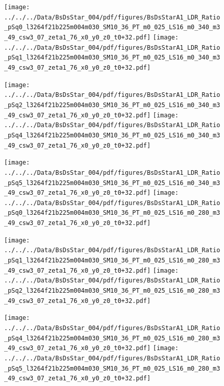 \documentclass[a4paper,10pt]{article}
\begin{document}
\begin{figure}[p]
 \texttt{[image: ../../../Data/BsDsStar\_004/pdf/figures/BsDsStarA1\_LDR\_Ratio\_pSq0\_l3264f21b225m004m030\_SM10\_36\_PT\_m0\_025\_LS16\_m0\_340\_m3\_49\_csw3\_07\_zeta1\_76\_x0\_y0\_z0\_t0+32.pdf]} 
 \texttt{[image: ../../../Data/BsDsStar\_004/pdf/figures/BsDsStarA1\_LDR\_Ratio\_pSq1\_l3264f21b225m004m030\_SM10\_36\_PT\_m0\_025\_LS16\_m0\_340\_m3\_49\_csw3\_07\_zeta1\_76\_x0\_y0\_z0\_t0+32.pdf]} 
 \end{figure}
\begin{figure}[p]
 \texttt{[image: ../../../Data/BsDsStar\_004/pdf/figures/BsDsStarA1\_LDR\_Ratio\_pSq2\_l3264f21b225m004m030\_SM10\_36\_PT\_m0\_025\_LS16\_m0\_340\_m3\_49\_csw3\_07\_zeta1\_76\_x0\_y0\_z0\_t0+32.pdf]} 
 \texttt{[image: ../../../Data/BsDsStar\_004/pdf/figures/BsDsStarA1\_LDR\_Ratio\_pSq4\_l3264f21b225m004m030\_SM10\_36\_PT\_m0\_025\_LS16\_m0\_340\_m3\_49\_csw3\_07\_zeta1\_76\_x0\_y0\_z0\_t0+32.pdf]} 
 \end{figure}
\begin{figure}[p]
 \texttt{[image: ../../../Data/BsDsStar\_004/pdf/figures/BsDsStarA1\_LDR\_Ratio\_pSq5\_l3264f21b225m004m030\_SM10\_36\_PT\_m0\_025\_LS16\_m0\_340\_m3\_49\_csw3\_07\_zeta1\_76\_x0\_y0\_z0\_t0+32.pdf]} 
 \texttt{[image: ../../../Data/BsDsStar\_004/pdf/figures/BsDsStarA1\_LDR\_Ratio\_pSq0\_l3264f21b225m004m030\_SM10\_36\_PT\_m0\_025\_LS16\_m0\_280\_m3\_49\_csw3\_07\_zeta1\_76\_x0\_y0\_z0\_t0+32.pdf]} 
 \end{figure}
\clearpage
\begin{figure}[p]
 \texttt{[image: ../../../Data/BsDsStar\_004/pdf/figures/BsDsStarA1\_LDR\_Ratio\_pSq1\_l3264f21b225m004m030\_SM10\_36\_PT\_m0\_025\_LS16\_m0\_280\_m3\_49\_csw3\_07\_zeta1\_76\_x0\_y0\_z0\_t0+32.pdf]} 
 \texttt{[image: ../../../Data/BsDsStar\_004/pdf/figures/BsDsStarA1\_LDR\_Ratio\_pSq2\_l3264f21b225m004m030\_SM10\_36\_PT\_m0\_025\_LS16\_m0\_280\_m3\_49\_csw3\_07\_zeta1\_76\_x0\_y0\_z0\_t0+32.pdf]} 
 \end{figure}
\begin{figure}[p]
 \texttt{[image: ../../../Data/BsDsStar\_004/pdf/figures/BsDsStarA1\_LDR\_Ratio\_pSq4\_l3264f21b225m004m030\_SM10\_36\_PT\_m0\_025\_LS16\_m0\_280\_m3\_49\_csw3\_07\_zeta1\_76\_x0\_y0\_z0\_t0+32.pdf]} 
 \texttt{[image: ../../../Data/BsDsStar\_004/pdf/figures/BsDsStarA1\_LDR\_Ratio\_pSq5\_l3264f21b225m004m030\_SM10\_36\_PT\_m0\_025\_LS16\_m0\_280\_m3\_49\_csw3\_07\_zeta1\_76\_x0\_y0\_z0\_t0+32.pdf]} 
 \end{figure}
\clearpage
\end{document}
